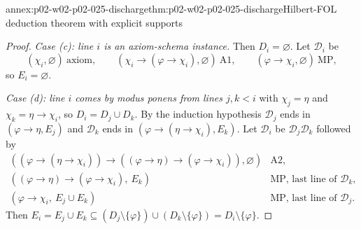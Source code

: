 \begin{annexitem}{annex:p02-w02-p02-025-discharge}{thm:p02-w02-p02-025-discharge}{Hilbert-FOL deduction theorem with explicit supports}
\begin{proof}
\emph{Case (c): line \(i\) is an axiom-schema instance.}  Then
\(D_i=\varnothing\).  Let \(\mathcal D_i\) be
\[
 (\chi_i,\varnothing)\ \text{axiom},\qquad
 (\chi_i\to(\varphi\to\chi_i),\varnothing)\ \text{A1},\qquad
 (\varphi\to\chi_i,\varnothing)\ \text{MP},
\]
so \(E_i=\varnothing\).

\emph{Case (d): line \(i\) comes by modus ponens from lines \(j,k<i\)} with
\(\chi_j=\eta\) and \(\chi_k=\eta\to\chi_i\), so \(D_i=D_j\cup D_k\).  By the
induction hypothesis \(\mathcal D_j\) ends in \((\varphi\to\eta,E_j)\) and
\(\mathcal D_k\) ends in \((\varphi\to(\eta\to\chi_i),E_k)\).  Let
\(\mathcal D_i\) be \(\mathcal D_j\mathcal D_k\) followed by
\[
\begin{array}{ll}
 ((\varphi\to(\eta\to\chi_i))\to((\varphi\to\eta)\to(\varphi\to\chi_i)),
   \varnothing) & \text{A2},\\
 ((\varphi\to\eta)\to(\varphi\to\chi_i),\ E_k) & \text{MP, last line of }\mathcal D_k,\\
 (\varphi\to\chi_i,\ E_j\cup E_k) & \text{MP, last line of }\mathcal D_j.
\end{array}
\]
Then
\(E_i=E_j\cup E_k\subseteq(D_j\setminus\{\varphi\})\cup(D_k\setminus\{\varphi\})
=D_i\setminus\{\varphi\}\).


\end{proof}
\end{annexitem}
